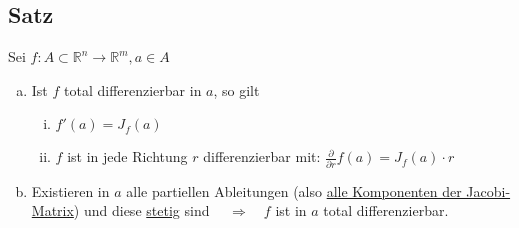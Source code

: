 \documentclass[11pt,a4paper]{book}
\newcommand {\Rn}	{\mathbb{R}^n}
\newcommand {\Rm}	{\mathbb{R}^m}
\newcommand{\1}    	{\mathbbm{1}}
\begin{document}
\subsection{Satz}
Sei \(f : A \subset \Rn \rightarrow \Rm, a \in A\)
\begin{enumerate}[a.~]
	\item Ist \(f\) total differenzierbar in \(a\), so gilt
	\begin{enumerate}[(i)]
		\item \(f'(a) = J_f(a) \)
		\item \(f\) ist in jede Richtung \(r\) differenzierbar mit: \( \frac{\partial}{\partial r} f(a) = J_f(a) \cdot r \)
	\end{enumerate}
	\item Existieren in \(a\) alle partiellen Ableitungen (also \underline{alle Komponenten der Jacobi-Matrix}) und diese \underline{stetig} sind \(\quad \Rightarrow \quad f\) ist in \(a\) total differenzierbar.
\end{enumerate}
\end{document}
